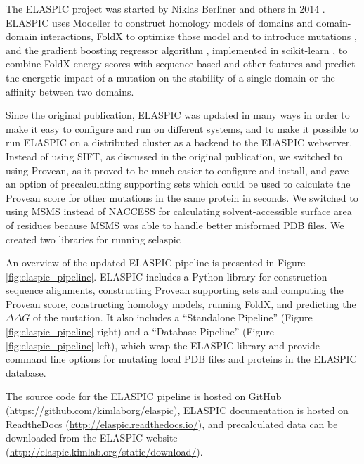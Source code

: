The ELASPIC project was started by Niklas Berliner and others in 2014 \cite{berliner_combining_2014}. ELASPIC uses Modeller \cite{webb_comparative_2002} to construct homology models of domains and domain-domain interactions, FoldX to optimize those model and to introduce mutations \cite{schymkowitz_foldx_2005}, and the gradient boosting regressor algorithm \cite{berliner_combining_2014}, implemented in scikit-learn \cite{scikit-learn}, to combine FoldX energy scores with sequence-based and other features and predict the energetic impact of a mutation on the stability of a single domain or the affinity between two domains.

Since the original publication, ELASPIC was updated in many ways in order to make it easy to configure and run on different systems, and to make it possible to run ELASPIC on a distributed cluster as a backend to the ELASPIC webserver. Instead of using SIFT, as discussed in the original publication, we switched to using Provean, as it proved to be much easier to configure and install, and gave an option of precalculating supporting sets which could be used to calculate the Provean score for other mutations in the same protein in seconds. We switched to using MSMS instead of NACCESS for calculating solvent-accessible surface area of residues because MSMS was able to handle better misformed PDB files. We created two libraries for running selaspic

An overview of the updated ELASPIC pipeline is presented in Figure \ref{fig:elaspic_pipeline}. ELASPIC includes a Python library for construction sequence alignments, constructing Provean supporting sets and computing the Provean score, constructing homology models, running FoldX, and predicting the $\Delta \Delta G$ of the mutation. It also includes a ``Standalone Pipeline'' (Figure \ref{fig:elaspic_pipeline} right) and a ``Database Pipeline'' (Figure \ref{fig:elaspic_pipeline} left), which wrap the ELASPIC library and provide command line options for mutating local PDB files and proteins in the ELASPIC database.

The source code for the ELASPIC pipeline is hosted on GitHub (\url{https://github.com/kimlaborg/elaspic}), ELASPIC documentation is hosted on ReadtheDocs (\url{http://elaspic.readthedocs.io/}), and precalculated data can be downloaded from the ELASPIC website (\url{http://elaspic.kimlab.org/static/download/}).


